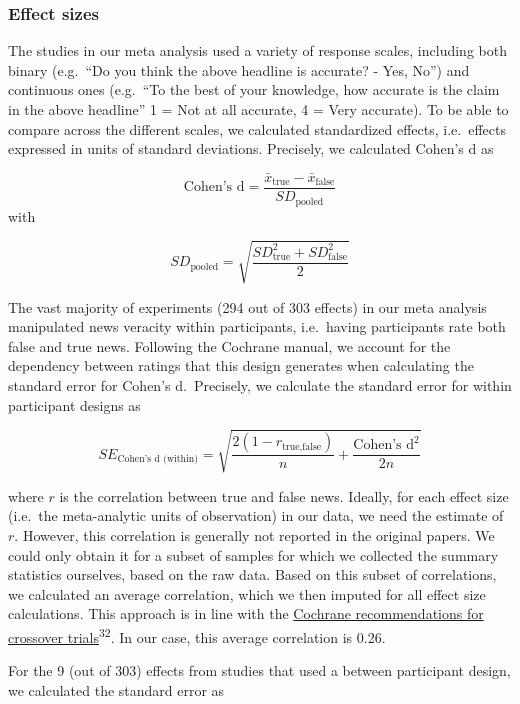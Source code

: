 \documentclass[
  doc,floatsintext]{apa6}
\begin{document}
\subsubsection{Effect sizes}\label{effect-sizes}

The studies in our meta analysis used a variety of response scales, including both binary (e.g.~``Do you think the above headline is accurate? - Yes, No'') and continuous ones (e.g.~``To the best of your knowledge, how accurate is the claim in the above headline'' 1 = Not at all accurate, 4 = Very accurate). To be able to compare across the different scales, we calculated standardized effects, i.e.~effects expressed in units of standard deviations. Precisely, we calculated Cohen's d as

\[
\text{Cohen's d} = \frac{\bar{x}_{\text{true}} - \bar{x}_{\text{false}}}{SD_{\text{pooled}}}
\] with

\[
SD_{\text{pooled}} = \sqrt{\frac{SD_{\text{true}}^2+SD_{\text{false}}^2}{2}}
\]

The vast majority of experiments (294 out of 303 effects) in our meta analysis manipulated news veracity within participants, i.e.~having participants rate both false and true news. Following the Cochrane manual, we account for the dependency between ratings that this design generates when calculating the standard error for Cohen's d.~Precisely, we calculate the standard error for within participant designs as

\[
SE_{\text{Cohen's d (within)}} = \sqrt{\frac{2(1-r_{\text{true},\text{false}})}{n}+\frac{\text{Cohen's d}^2}{2n}}
\]

where \(r\) is the correlation between true and false news. Ideally, for each effect size (i.e.~the meta-analytic units of observation) in our data, we need the estimate of \(r\). However, this correlation is generally not reported in the original papers. We could only obtain it for a subset of samples for which we collected the summary statistics ourselves, based on the raw data. Based on this subset of correlations, we calculated an average correlation, which we then imputed for all effect size calculations. This approach is in line with the \href{https://training.cochrane.org/handbook/current/chapter-23\#section-23-2-7-3}{Cochrane recommendations for crossover trials}\textsuperscript{32}. In our case, this average correlation is 0.26.

For the 9 (out of 303) effects from studies that used a between participant design, we calculated the standard error as
\end{document}
